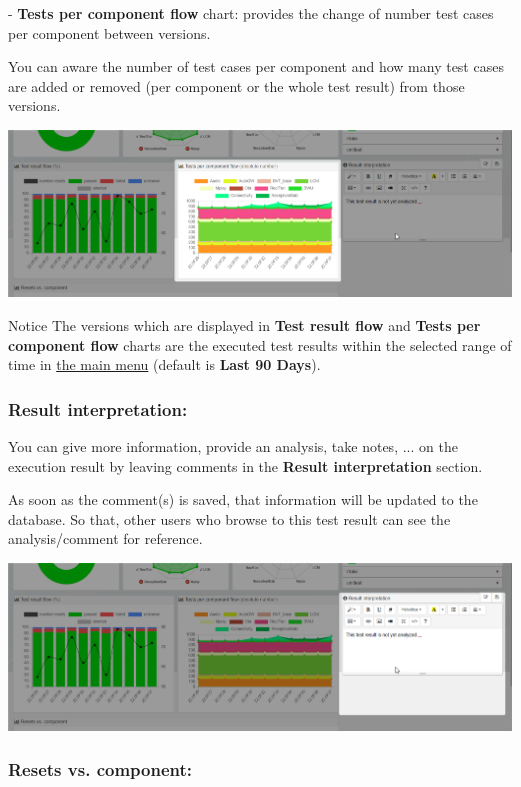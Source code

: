 - \textbf{Tests per component flow} chart: provides the change of number test
cases per component between versions.

You can aware the number of test cases per component and how many test cases are
added or removed (per component or the whole test result) from those versions.

\includegraphics[width=1\linewidth]
{./pictures/dashboard/chart_tests_per_component_flow.png}

\begin{boxhint}{Notice}
The versions which are displayed in \textbf{Test result flow} and 
\textbf{Tests per component flow} charts are the executed test results within 
the selected range of time in 
\hyperref[main-menu]{the main menu} (default is \textbf{Last 90 Days}).
\end{boxhint}

\subsubsection{Result interpretation:}
You can give more information, provide an analysis, take notes, ... on the 
execution result by leaving comments in the \textbf{Result interpretation} 
section.

As soon as the comment(s) is saved, that information will be updated to 
the database. So that, other users who browse to this test result can see
the analysis/comment for reference.

\includegraphics[width=1\linewidth]
{./pictures/dashboard/result_interpretation.png}

\subsubsection{Resets vs. component:}

